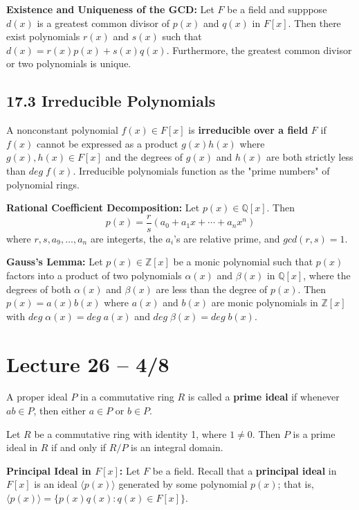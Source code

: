 \documentclass{article}
\newcommand{\Z}{\mathbb{Z}}
\newcommand{\Q}{\mathbb{Q}}
\begin{document}
\begin{theorem}
  \textbf{Existence and Uniqueness of the GCD: }Let $F$ be a field and supppose $d(x)$ is a greatest common divisor of $p(x)$ and $q(x)$ in $F[x]$. Then there exist polynomials $r(x)$ and $s(x)$ such that $d(x)=r(x)p(x)+s(x)q(x)$. Furthermore, the greatest common divisor or two polynomials is unique.
\end{theorem}

\subsection{17.3 Irreducible Polynomials}
A nonconstant polynomial $f(x)\in F[x]$ is \textbf{irreducible over a field} $F$ if $f(x)$ cannot be expressed as a product $g(x)h(x)$ where $g(x), h(x)\in F[x]$ and the degrees of $g(x)$ and $h(x)$ are both strictly less than $deg\;f(x)$. Irreducible polynomials function as the "prime numbers" of polynomial rings.

\begin{theorem}
  \textbf{Rational Coefficient Decomposition: }Let $p(x)\in\Q[x]$. Then \[p(x)=\frac{r}{s}(a_0+a_1x+\cdots+a_nx^n)\] where $r,s,a_9,\dots,a_n$ are integerts, the $a_i$'s are relative prime, and $gcd(r,s)=1$.
\end{theorem}

\begin{theorem}
  \textbf{Gauss's Lemma: }Let $p(x)\in\Z[x]$ be a monic polynomial such that $p(x)$ factors into a product of two polynomials $\alpha(x)$ and $\beta(x)$ in $\Q[x]$, where the degrees of both $\alpha(x)$ and $\beta(x)$ are less than the degree of $p(x)$. Then $p(x)=a(x)b(x)$ where $a(x)$ and $b(x)$ are monic polynomials in $\Z[x]$ with $deg\;\alpha(x)=deg\;a(x)$ and $deg\;\beta(x)=deg\;b(x)$.
\end{theorem}
\section{Lecture 26 -- 4/8}
A proper ideal $P$ in a commutative ring $R$ is called a \textbf{prime ideal} if whenever $ab\in P$, then either $a\in P$ or $b\in P$.

Let $R$ be a commutative ring with identity 1, where $1\neq0$. Then $P$ is a prime ideal in $R$ if and only if $R/P$ is an integral domain.

\textbf{Principal Ideal in $F[x]$:} Let $F$ be a field. Recall that a \textbf{principal ideal} in $F[x]$ is an ideal $\langle p(x)\rangle$ generated by some polynomial $p(x)$; that is, $\langle p(x)\rangle=\{p(x)q(x):q(x)\in F[x]\}$.
\end{document}
